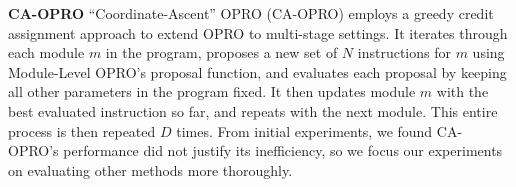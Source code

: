 \textbf{CA-OPRO} ``Coordinate-Ascent'' OPRO (CA-OPRO) employs a greedy credit assignment approach to extend OPRO to multi-stage settings. It iterates through each module $m$ in the program, proposes a new set of $N$ instructions for $m$ using Module-Level OPRO's proposal function, and evaluates each proposal by keeping all other parameters in the program fixed. It then updates module $m$ with the best evaluated instruction so far, and repeats with the next module. This entire process is then repeated $D$ times. From initial experiments, we found CA-OPRO's performance did not justify its inefficiency, so we focus our experiments on evaluating other methods more thoroughly.
